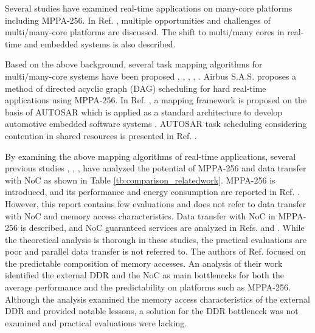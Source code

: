 \documentclass[conference,compsoc]{IEEEtran}
\begin{document}
Several studies have examined real-time applications on many-core platforms including MPPA-256.
In Ref. \cite{saidi2015shift}, multiple opportunities and challenges of multi/many-core platforms are discussed.
The shift to multi/many cores in real-time and embedded systems is also described. 

Based on the above background, several task mapping algorithms for multi/many-core systems have been proposed \cite{perret2016mapping}, \cite{puffitsch2015off}, \cite{carle2014static}, \cite{becker2014mapping}, \cite{faragardi2014communication}.
Airbus S.A.S. \cite{perret2016mapping} proposes a method of directed acyclic graph (DAG) scheduling for hard real-time applications using MPPA-256.
In Ref. \cite{faragardi2014communication}, a mapping framework is proposed on the basis of AUTOSAR which is applied as a standard architecture to develop automotive embedded software systems \cite{furst2009autosar}.
AUTOSAR task scheduling considering contention in shared resources is presented in Ref. \cite{becker2016contention}.

By examining the above mapping algorithms of real-time applications, several previous studies \cite{kanter2015kalray}, \cite{denet2017work}, \cite{deDinechin2014GSN}, \cite{perret2016predictable} have analyzed the potential of MPPA-256 and data transfer with NoC as shown in Table \ref{tb:comparison_relatedwork}.
MPPA-256 is introduced, and its performance and energy consumption are reported in Ref. \cite{kanter2015kalray}.
However, this report contains few evaluations and does not refer to data transfer with NoC and memory access characteristics.
Data transfer with NoC in MPPA-256 is described, and NoC guaranteed services are analyzed in Refs. \cite{denet2017work} and \cite{deDinechin2014GSN}.
While the theoretical analysis is thorough in these studies, the practical evaluations are poor and parallel data transfer is not referred to.
The authors of Ref. \cite{perret2016predictable} focused on the predictable composition of memory accesses.
An analysis of their work identified the external DDR and the NoC as main bottlenecks for both the average performance and the predictability on platforms such as MPPA-256.
Although the analysis examined the memory access characteristics of the external DDR and provided notable lessons, a solution for the DDR bottleneck was not examined and practical evaluations were lacking.
\end{document}
